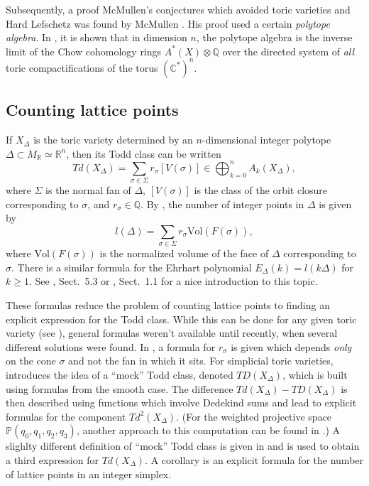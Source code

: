 \documentclass{amsart}
\theoremstyle{plain}
\theoremstyle{definition}
\begin{document}
	Subsequently, a proof McMullen's conjectures which avoided
toric varieties and Hard Lefschetz was found by McMullen \cite{McM}.
His proof used a certain {\it polytope algebra\/}.  In \cite{FS}, it
is shown that in dimension $n$, the polytope algebra is the inverse
limit of the Chow cohomology rings $A^*(X)\otimes\mathbb{Q}$ over the
directed system of {\it all\/} toric compactifications of the torus
$(\mathbb{C}^*)^n$.

	\subsection{Counting lattice points} If $X_\Delta$ is
the toric variety determined by an $n$-dimen\-sion\-al integer polytope
$\Delta \subset M_\mathbb{R} \simeq \mathbb{R}^n$, then its Todd class can
be written
\[
Td(X_\Delta) = \sum_{\sigma\in\Sigma} r_\sigma [V(\sigma)] \in
{\textstyle{\bigoplus}_{k=0}^n} A_k(X_\Delta),
\]
where $\Sigma$ is the normal fan of $\Delta$, $[V(\sigma)]$ is the
class of the orbit closure corresponding to $\sigma$, and $r_\sigma
\in \mathbb{Q}$.  By \cite{Dan2}, the number of integer points in
$\Delta$ is given by
\[
l(\Delta) = \sum_{\sigma\in\Sigma} r_\sigma
\mathrm{Vol}(F(\sigma)),
\]
where $\mathrm{Vol}(F(\sigma))$ is the normalized volume of the face of
$\Delta$ corresponding to $\sigma$.  There is a similar formula for
the Ehrhart polynomial $E_\Delta(k) = l(k\Delta)$ for $k \ge 1$.  See
\cite{Ful}, Sect.~5.3 or \cite{More2}, Sect.~1.1 for a nice
introduction to this topic.

	These formulas reduce the problem of counting lattice points
to finding an explicit expression for the Todd class.  While this can
be done for any given toric variety (see \cite{Ful}), general formulas
weren't available until recently, when several different solutions
were found.  In \cite{More2}, a formula for $r_\sigma$ is given which
depends {\it only\/} on the cone $\sigma$ and not the fan in which it
sits.  For simplicial toric varieties, \cite{Pom} introduces the idea
of a ``mock'' Todd class, denoted $TD(X_\Delta)$, which is built using
formulas from the smooth case.  The difference $Td(X_\Delta) -
TD(X_\Delta)$ is then described using functions which involve Dedekind
sums and lead to explicit formulas for the component $Td^2(X_\Delta)$.
(For the weighted projective space $\mathbb{P}(q_0,q_1,q_2,q_3)$, another
approach to this computation can be found in \cite{Lat}.)  A slighlty
different definition of ``mock'' Todd class is given in \cite{CS} and
is used to obtain a third expression for $Td(X_\Delta)$.  A corollary
is an explicit formula for the number of lattice points in an integer
simplex.  
\end{document}
